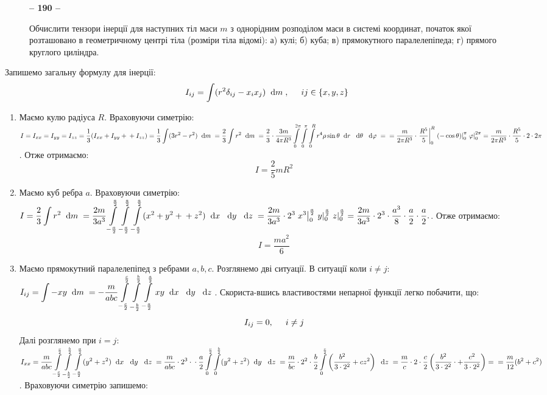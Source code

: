 \documentclass[a4paper,12pt]{article}
\newenvironment{task}[1]{\begin{figure*}[htp]\begin{framed}\begin{center}\textbf{-- {#1} --}\end{center}}{\end{framed}\end{figure*}}
\newcommand\dx[1]{\hspace*{0.2cm}\textrm{d}{#1}\hspace*{0.1cm}}
\newcommand\tab [1][0.5cm]{\hspace*{#1}}
\newcommand\dint{\displaystyle\int}
\begin{document}
\begin{justify}
\begin{task}{190}
			Обчислити тензори інерції для наступних тіл маси $m$ з однорідним розподілом маси в системі координат, початок якої розташовано в геометричному центрі тіла (розміри тіла відомі): а) кулі; б) куба; в) прямокутного паралелепіпеда; г) прямого круглого циліндра.
		\end{task}
		Запишемо загальну формулу для інерції:
		\begin{equation}
			I_{ij}=\dint(r^2\delta_{ij}-x_ix_j)\dx{m},\tab ij\in\{x,y,z\}
			\label{general_inertia_190}
		\end{equation}
		\begin{enumerate}[label=\alph*)]
			\item Маємо кулю радіуса $R$. Враховуючи симетрію: $I=I_{xx}=I_{yy}=I_{zz}=\dfrac13(I_{xx}+I_{yy}+\\+I_{zz})=\dfrac13\dint(3r^2-r^2)\dx{m}=\dfrac23\dint r^2\dx{m}=\dfrac23\cdot\dfrac{3m}{4\pi R^3}\dint\limits_0^{2\pi}\dint\limits_0^{\pi}\dint\limits_0^{R}r^4\rho\sin\theta\dx{r}\dx{\theta}\dx{\varphi}=\\=\dfrac{m}{2\pi R^3}\cdot\left.\dfrac{R^5}{5}\right|_0^R\left.(-\cos\theta)\right|_0^\pi\left.\varphi\right|_0^{2\pi}=\dfrac{m}{2\pi R^3}\cdot\dfrac{R^5}{5}\cdot 2\cdot2\pi$. Отже отримаємо:
				\begin{equation}
					I=\dfrac25 mR^2
					\label{inertia_190a}
				\end{equation}
			\item Маємо куб ребра $a$. Враховуючи симетрію: $I=\dfrac23\dint r^2\dx{m}=\dfrac{2m}{3 a^3}\dint\limits_{-\frac a2}^{\frac a2}\dint\limits_{-\frac a2}^{\frac a2}\dint\limits_{-\frac a2}^{\frac a2}(x^2+y^2+\\+z^2)\dx{x}\dx{y}\dx{z}=\dfrac{2m}{3 a^3}\cdot 2^3\left.x^3\right|_{0}^{\frac a2}\left.y\right|_{0}^{\frac a2}\left.z\right|_{0}^{\frac a2}=\dfrac{2m}{3 a^3}\cdot 2^3\cdot\dfrac{a^3}8\cdot\dfrac a2\cdot\dfrac a2.$. Отже отримаємо:
				\begin{equation}
					I=\dfrac{m a^2}{6}
					\label{inertia_190b}
				\end{equation}
			\item Маємо прямокутний паралелепіпед з ребрами $a,b,c$. Розглянемо дві ситуації. В ситуації коли $i\neq j$: $I_{ij}=\dint -xy\dx{m}=-\dfrac{m}{abc}\dint\limits_{-\frac c2}^{\frac c2}\dint\limits_{-\frac b2}^{\frac b2}\dint\limits_{-\frac a2}^{\frac a2}xy\dx{x}\dx{y}\dx{z}$. Скориста-вшись властивостями непарної функції легко побачити, що:
				$$
					I_{ij}=0,\tab i\neq j
				$$ 
				Далі розглянемо при $i=j$: $I_{xx}=\dfrac{m}{abc}\dint\limits_{-\frac c2}^{\frac c2}\dint\limits_{-\frac b2}^{\frac b2}\dint\limits_{-\frac a2}^{\frac a2}(y^2+z^2)\dx{x}\dx{y}\dx{z}=\dfrac{m}{abc}\cdot 2^3\cdot\\\cdot\dfrac a2\dint\limits_{0}^{\frac c2}\dint\limits_{0}^{\frac b2}(y^2+z^2)\dx{y}\dx{z}=\dfrac{m}{bc}\cdot 2^2\cdot\dfrac b2\dint\limits_{0}^{\frac c2}\left(\dfrac{b^2}{3\cdot 2^2}+cz^2\right)\dx{z}=\dfrac{m}{c}\cdot 2\cdot\dfrac c2\left(\dfrac{b^2}{3\cdot 2^2}\cdot+\dfrac{c^2}{3\cdot 2^2}\right)=\\=\dfrac{m}{12}(b^2+c^2)$. Враховуючи симетрію запишемо:

\end{enumerate}
\end{justify}
\end{document}
